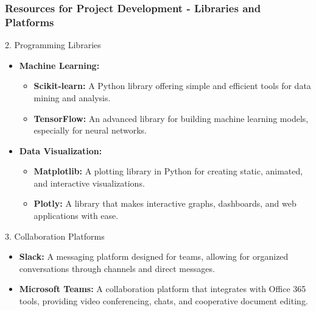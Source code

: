 \documentclass[aspectratio=169]{beamer}
\begin{document}
\begin{frame}[fragile]
    \frametitle{Resources for Project Development - Libraries and Platforms}
    \begin{block}{2. Programming Libraries}
        \begin{itemize}
            \item \textbf{Machine Learning:}
                \begin{itemize}
                    \item \textbf{Scikit-learn:} A Python library offering simple and efficient tools for data mining and analysis.
                    \item \textbf{TensorFlow:} An advanced library for building machine learning models, especially for neural networks.
                \end{itemize}
            \item \textbf{Data Visualization:}
                \begin{itemize}
                    \item \textbf{Matplotlib:} A plotting library in Python for creating static, animated, and interactive visualizations.
                    \item \textbf{Plotly:} A library that makes interactive graphs, dashboards, and web applications with ease.
                \end{itemize}
        \end{itemize}
    \end{block}

    \begin{block}{3. Collaboration Platforms}
        \begin{itemize}
            \item \textbf{Slack:} A messaging platform designed for teams, allowing for organized conversations through channels and direct messages.
            \item \textbf{Microsoft Teams:} A collaboration platform that integrates with Office 365 tools, providing video conferencing, chats, and cooperative document editing.
        \end{itemize}
    \end{block}
\end{frame}
\end{document}
